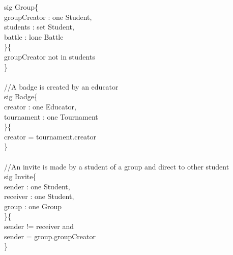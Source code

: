 \documentclass{article}
\begin{document}
{\color{blue}
sig
\color{black}
Group\{\\
\-\hspace{1cm}    groupCreator : \color{blue} one \color{black} Student,\\
\-\hspace{1cm}    students : \color{blue} set \color{black} Student,\\
\-\hspace{1cm}    battle : \color{blue} lone \color{black} Battle\\
\}\{\\
\-\hspace{1cm}    groupCreator \color{blue} not in \color{black} students	\\
\}\\
\\
\color{gray}
//A badge is created by an educator\\
\color{blue}
sig
\color{black}
Badge\{\\
\-\hspace{1cm}    creator : \color{blue} one \color{black} Educator,\\
\-\hspace{1cm}    tournament : \color{blue} one \color{black} Tournament\\
\}\{\\
\-\hspace{1cm}    creator \color{blue} = \color{black} tournament.creator\\
\}\\
\\
\color{gray}
//An invite is made by a student of a group and direct to other student\\
\color{blue}
sig
\color{black}
Invite\{\\
\-\hspace{1cm}    sender : \color{blue} one \color{black} Student,\\
\-\hspace{1cm}    receiver : \color{blue} one \color{black} Student,\\
\-\hspace{1cm}    group : \color{blue} one \color{black} Group\\
\}\{\\
\-\hspace{1cm}    sender \color{blue} != \color{black} receiver \color{blue} and \color{black}\\
\-\hspace{1cm}    sender \color{blue} = \color{black} group.groupCreator \\
\}\\
\\

}
\end{document}
